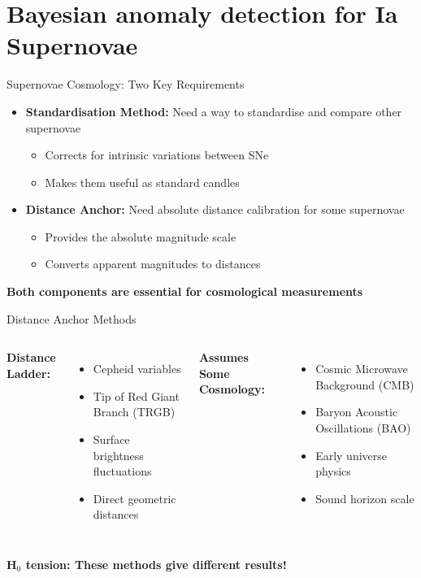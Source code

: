 \documentclass[aspectratio=169]{beamer}
\begin{document}
\section{Bayesian anomaly detection for Ia Supernovae}

\begin{frame}{Supernovae Cosmology: Two Key Requirements}
  \begin{itemize}
    \item \textbf{Standardisation Method:} Need a way to standardise and compare other supernovae
      \begin{itemize}
        \item Corrects for intrinsic variations between SNe
        \item Makes them useful as standard candles
      \end{itemize}
    \item \textbf{Distance Anchor:} Need absolute distance calibration for some supernovae
      \begin{itemize}
        \item Provides the absolute magnitude scale
        \item Converts apparent magnitudes to distances
      \end{itemize}
  \end{itemize}
  \vfill
  \centering
  \textbf{Both components are essential for cosmological measurements}
\end{frame}

\begin{frame}{Distance Anchor Methods}
  \begin{columns}
    \textbf{Distance Ladder:}
    \begin{itemize}
      \item Cepheid variables
      \item Tip of Red Giant Branch (TRGB)
      \item Surface brightness fluctuations
      \item Direct geometric distances
    \end{itemize}
    
    \textbf{Assumes Some Cosmology:}
    \begin{itemize}
      \item Cosmic Microwave Background (CMB)
      \item Baryon Acoustic Oscillations (BAO)
      \item Early universe physics
      \item Sound horizon scale
    \end{itemize}
  \end{columns}
  \vfill
  \centering
  \textbf{H$_0$ tension: These methods give different results!}
\end{frame}
\end{document}

